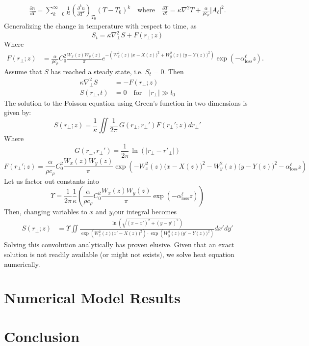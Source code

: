 \documentclass{article}
\begin{document}
\begin{equation*}
    \begin{aligned}
       \frac{\partial n}{\partial T} = \sum_{k=0}^\infty \frac{1}{k!}  \left( \frac{\partial^k n}{\partial T^k} \right)_{T_0} (T-T_0)^k \quad \text{where} \quad
        \frac{\partial T}{\partial t} = \kappa \nabla^2 T + \frac{\alpha}{\rho c_\rho}|A_\ell| ^2.
    \end{aligned}
\end{equation*}
Generalizing the change in temperature with respect to time, as $$S_{t} = \kappa \nabla_{\perp}^2 S + F(r_{\perp}; z)$$
Where
\begin{equation*}
    \begin{aligned}
        F(r_{\perp}; z) &= \frac{\alpha }{\rho c_\rho} C_0^2 \frac{ W_{x}(z) W_{y}(z)}{\pi} e^{-\left( W_{x}^{2}(z) \big( x - X(z) \big)^{2} + W_{y}^{2}(z) \big( y - Y(z) \big)^{2} \right)} \exp{(- \alpha^\ell_\text{loss} z)}.
    \end{aligned} 
\end{equation*}
Assume that $S$ has reached a steady state, i.e. $S_{t} = 0 $. Then
\begin{equation*}
    \begin{aligned}
        \kappa \nabla_{\perp}^2 S &= -F(r_{\perp}; z) \\
        S(r_{\perp},t) &= 0 \quad \mbox{for} \quad |r_\perp| \gg l_0
    \end{aligned} 
\end{equation*}
The solution to the Poisson equation using Green's function in two dimensions is given by:
$$S(r_{\perp};z) = \frac{1}{\kappa} \iint \frac{1}{2\pi}\, G(r_\perp, r_\perp ')  F(r_{\perp}'; z)  d r_{\perp}' $$
Where 
$$G(r_\perp, r_\perp ') = \frac{1}{2\pi}\, \ln{(|r_{\perp} - r'_{\perp}|)} $$
$$F(r_{\perp}'; z) = \frac{\alpha }{\rho c_\rho} C_0^2 \frac{ W_{x}(z) W_{y}(z)}{\pi} \exp{\left(-W_{x}^{2}(z) \big( x - X(z) \big)^{2} - W_{y}^{2}(z) \big( y - Y(z) \big)^{2} - \alpha^\ell_\text{loss} z \right)}$$
Let us factor out constants into $$\Upsilon = \frac{1}{2\pi} \frac{1}{\kappa} \left( \frac{\alpha }{\rho c_\rho} C_0^2 \frac{ W_{x}(z) W_{y}(z)}{\pi} \exp{(- \alpha^\ell_\text{loss} z)} \right)$$
Then, changing variables to $x$ and $y$,our integral becomes 
\begin{equation*}
\begin{aligned}
    S(r_{\perp};z) &= \Upsilon \iint \frac{\ln{\left(\sqrt{(x-x')^2 + (y-y')^2}\right)}}{\exp{(W_{x}^{2}(z) \big( x' - X(z) \big)^{2})} \cdot \exp({W_{y}^{2}(z) \big( y' - Y(z) \big)^{2}}) } dx'dy' 
\end{aligned}
\end{equation*}
Solving this convolution analytically has proven elusive. Given that an exact solution is not readily available (or might not exists), we solve heat equation numerically.

\section{Numerical Model Results}

\section{Conclusion}
\end{document}
